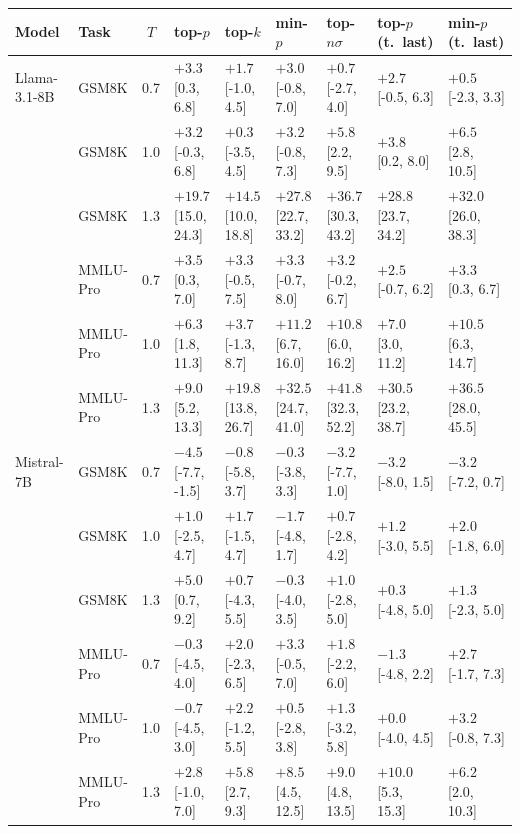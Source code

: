 \begin{tabular}{llcllllll}
\toprule
Model & Task & $T$ & top-$p$ & top-$k$ & min-$p$ & top-$n\sigma$ & top-$p$ (t.\ last) & min-$p$ (t.\ last) \\
\midrule
Llama-3.1-8B & GSM8K & 0.7 & $\mathbf{+3.3}$ [0.3, 6.8] & $+1.7$ [-1.0, 4.5] & $+3.0$ [-0.8, 7.0] & $+0.7$ [-2.7, 4.0] & $+2.7$ [-0.5, 6.3] & $+0.5$ [-2.3, 3.3] \\
 & GSM8K & 1.0 & $+3.2$ [-0.3, 6.8] & $+0.3$ [-3.5, 4.5] & $+3.2$ [-0.8, 7.3] & $\mathbf{+5.8}$ [2.2, 9.5] & $\mathbf{+3.8}$ [0.2, 8.0] & $\mathbf{+6.5}$ [2.8, 10.5] \\
 & GSM8K & 1.3 & $\mathbf{+19.7}$ [15.0, 24.3] & $\mathbf{+14.5}$ [10.0, 18.8] & $\mathbf{+27.8}$ [22.7, 33.2] & $\mathbf{+36.7}$ [30.3, 43.2] & $\mathbf{+28.8}$ [23.7, 34.2] & $\mathbf{+32.0}$ [26.0, 38.3] \\
 & MMLU-Pro & 0.7 & $\mathbf{+3.5}$ [0.3, 7.0] & $+3.3$ [-0.5, 7.5] & $+3.3$ [-0.7, 8.0] & $+3.2$ [-0.2, 6.7] & $+2.5$ [-0.7, 6.2] & $\mathbf{+3.3}$ [0.3, 6.7] \\
 & MMLU-Pro & 1.0 & $\mathbf{+6.3}$ [1.8, 11.3] & $+3.7$ [-1.3, 8.7] & $\mathbf{+11.2}$ [6.7, 16.0] & $\mathbf{+10.8}$ [6.0, 16.2] & $\mathbf{+7.0}$ [3.0, 11.2] & $\mathbf{+10.5}$ [6.3, 14.7] \\
 & MMLU-Pro & 1.3 & $\mathbf{+9.0}$ [5.2, 13.3] & $\mathbf{+19.8}$ [13.8, 26.7] & $\mathbf{+32.5}$ [24.7, 41.0] & $\mathbf{+41.8}$ [32.3, 52.2] & $\mathbf{+30.5}$ [23.2, 38.7] & $\mathbf{+36.5}$ [28.0, 45.5] \\
\midrule
Mistral-7B & GSM8K & 0.7 & $-4.5$ [-7.7, -1.5] & $-0.8$ [-5.8, 3.7] & $-0.3$ [-3.8, 3.3] & $-3.2$ [-7.7, 1.0] & $-3.2$ [-8.0, 1.5] & $-3.2$ [-7.2, 0.7] \\
 & GSM8K & 1.0 & $+1.0$ [-2.5, 4.7] & $+1.7$ [-1.5, 4.7] & $-1.7$ [-4.8, 1.7] & $+0.7$ [-2.8, 4.2] & $+1.2$ [-3.0, 5.5] & $+2.0$ [-1.8, 6.0] \\
 & GSM8K & 1.3 & $\mathbf{+5.0}$ [0.7, 9.2] & $+0.7$ [-4.3, 5.5] & $-0.3$ [-4.0, 3.5] & $+1.0$ [-2.8, 5.0] & $+0.3$ [-4.8, 5.0] & $+1.3$ [-2.3, 5.0] \\
 & MMLU-Pro & 0.7 & $-0.3$ [-4.5, 4.0] & $+2.0$ [-2.3, 6.5] & $+3.3$ [-0.5, 7.0] & $+1.8$ [-2.2, 6.0] & $-1.3$ [-4.8, 2.2] & $+2.7$ [-1.7, 7.3] \\
 & MMLU-Pro & 1.0 & $-0.7$ [-4.5, 3.0] & $+2.2$ [-1.2, 5.5] & $+0.5$ [-2.8, 3.8] & $+1.3$ [-3.2, 5.8] & $+0.0$ [-4.0, 4.5] & $+3.2$ [-0.8, 7.3] \\
 & MMLU-Pro & 1.3 & $+2.8$ [-1.0, 7.0] & $\mathbf{+5.8}$ [2.7, 9.3] & $\mathbf{+8.5}$ [4.5, 12.5] & $\mathbf{+9.0}$ [4.8, 13.5] & $\mathbf{+10.0}$ [5.3, 15.3] & $\mathbf{+6.2}$ [2.0, 10.3] \\

\end{tabular}
